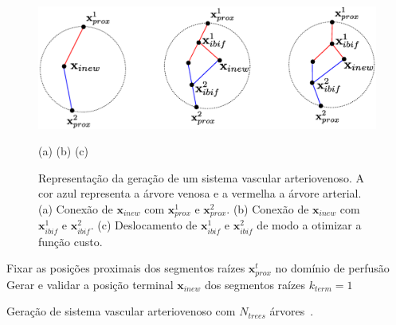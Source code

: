 \begin{figure}[!htb]
  \centering
  \captiondelim{: }
  \caption{Representa\c{c}\~ao da gera\c{c}\~ao de um sistema vascular arteriovenoso. 
  A cor azul representa a árvore venosa e a vermelha a árvore arterial.
  (a) Conexão de $\mathbf{x}_{inew}$ com $\mathbf{x}_{prox}^1$ e $\mathbf{x}_{prox}^2$.
  (b) Conexão de $\mathbf{x}_{inew}$ com $\mathbf{x}_{ibif}^1$ e $\mathbf{x}_{ibif}^2$.
  (c) Deslocamento de $\mathbf{x}_{ibif}^1$ e $\mathbf{x}_{ibif}^2$ de modo a otimizar a função custo.}
  \includegraphics[width = \textwidth]{figuras/modelos-computacionais-de-arvores-circulatorias/passos-algoritmo-arteriovenoso.eps}

  (a) \hspace{0.33\textwidth} (b) \hspace{0.33\textwidth} (c)
  \label{fig:CCOVenosoArterial}
\end{figure}

\begin{algorithm}
  Fixar as posi\c{c}\~oes proximais dos segmentos raízes $\mathbf{x}_{prox}^t$ no domínio de perfusão\; 
  Gerar e validar a posi\c{c}\~ao terminal $\mathbf{x}_{inew}$ dos segmentos raízes\;
  $k_{term} = 1$\;
  \caption{Gera\c{c}ão de sistema vascular arteriovenoso com $N_{trees}$ árvores~\cite{Queiroz2013,Queiroz2018}.}
  \label{algo:CCOVenosoArterial}
\end{algorithm}

